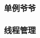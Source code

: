 \documentclass[conference]{IEEEtran}
\begin{document}
\subsubsection{单例爷爷}
\subsubsection{线程管理}



\end{document}
